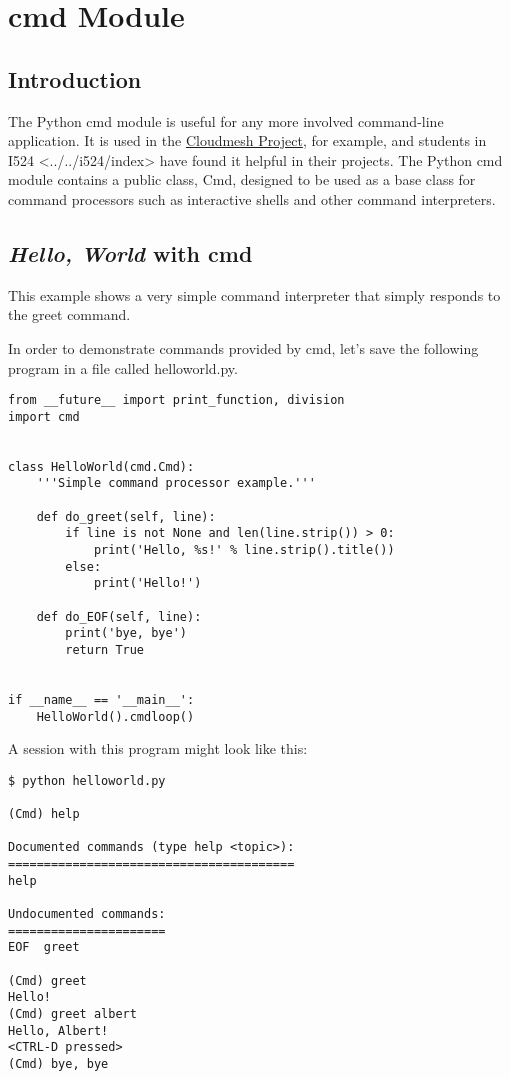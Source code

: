 \section{cmd Module}\label{cmd-module}

\subsection{Introduction}\label{introduction}

The Python cmd module is useful for any more involved command-line
application. It is used in the
\href{http://cloudmesh.github.io/}{Cloudmesh Project}, for example, and
students in I524
\textless{}../../i524/index\textgreater{} have found it helpful in their
projects. The Python cmd module contains a public class, Cmd, designed
to be used as a base class for command processors such as interactive
shells and other command interpreters.

\subsection{\texorpdfstring{\emph{Hello, World} with
cmd}{Hello, World with cmd}}\label{hello-world-with-cmd}

This example shows a very simple command interpreter that simply
responds to the greet command.

In order to demonstrate commands provided by cmd, let's save the
following program in a file called helloworld.py.

\begin{lstlisting}
from __future__ import print_function, division
import cmd


class HelloWorld(cmd.Cmd):
    '''Simple command processor example.'''

    def do_greet(self, line):
        if line is not None and len(line.strip()) > 0:
            print('Hello, %s!' % line.strip().title())
        else:
            print('Hello!')

    def do_EOF(self, line):
        print('bye, bye')
        return True


if __name__ == '__main__':
    HelloWorld().cmdloop()
\end{lstlisting}

A session with this program might look like this:

\begin{lstlisting}
$ python helloworld.py

(Cmd) help

Documented commands (type help <topic>):
========================================
help

Undocumented commands:
======================
EOF  greet

(Cmd) greet
Hello!
(Cmd) greet albert
Hello, Albert!
<CTRL-D pressed>
(Cmd) bye, bye
\end{lstlisting}

